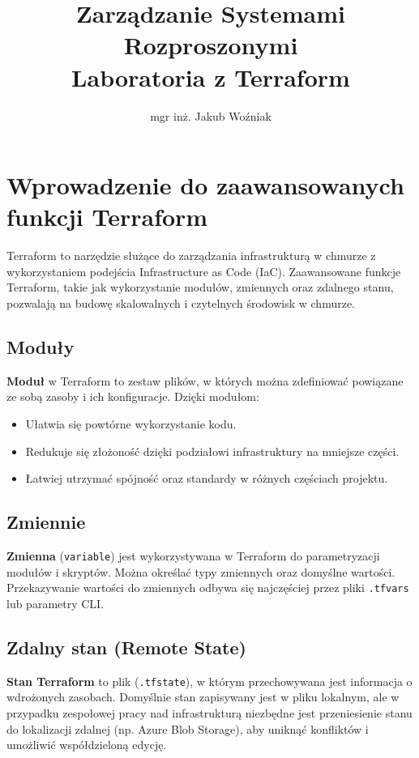 \documentclass{article}
\title{Zarządzanie Systemami Rozproszonymi\\Laboratoria z Terraform}
\author{mgr inż. Jakub Woźniak}
\date{}
\begin{document}
\maketitle

\section{Wprowadzenie do zaawansowanych funkcji Terraform}
Terraform to narzędzie służące do zarządzania infrastrukturą w chmurze z wykorzystaniem podejścia Infrastructure as Code (IaC). Zaawansowane funkcje Terraform, takie jak wykorzystanie modułów, zmiennych oraz zdalnego stanu, pozwalają na budowę skalowalnych i czytelnych środowisk w chmurze. 

\subsection{Moduły}
\textbf{Moduł} w Terraform to zestaw plików, w których można zdefiniować powiązane ze sobą zasoby i ich konfiguracje. Dzięki modułom:
\begin{itemize}
    \item Ułatwia się powtórne wykorzystanie kodu.
    \item Redukuje się złożoność dzięki podziałowi infrastruktury na mniejsze części.
    \item Łatwiej utrzymać spójność oraz standardy w różnych częściach projektu.
\end{itemize}

\subsection{Zmiennie}
\textbf{Zmienna} (\texttt{variable}) jest wykorzystywana w Terraform do parametryzacji modułów i skryptów. Można określać typy zmiennych oraz domyślne wartości. Przekazywanie wartości do zmiennych odbywa się najczęściej przez pliki \texttt{.tfvars} lub parametry CLI.

\subsection{Zdalny stan (Remote State)}
\textbf{Stan Terraform} to plik (\texttt{.tfstate}), w którym przechowywana jest informacja o wdrożonych zasobach. Domyślnie stan zapisywany jest w pliku lokalnym, ale w przypadku zespołowej pracy nad infrastrukturą niezbędne jest przeniesienie stanu do lokalizacji zdalnej (np. Azure Blob Storage), aby uniknąć konfliktów i umożliwić współdzieloną edycję.
\end{document}
